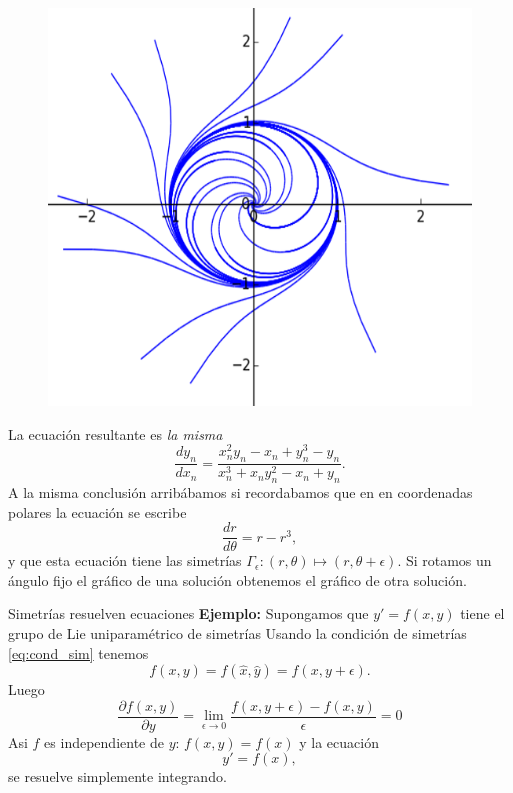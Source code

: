 \begin{figure}
 \includegraphics[scale=.4]{imagenes/sol_rotadas.png}
\end{figure}
La ecuación resultante es \emph{la misma}
\[\frac{dy_n}{dx_n}=\frac{x_{n}^{2} y_{n} - x_{n} + y_{n}^{3} - y_{n}}{x_{n}^{3} + x_{n} y_{n}^{2}
    - x_{n} + y_{n}}.\]
A la misma conclusión arribábamos si recordabamos que en en coordenadas polares la ecuación se escribe
\[\frac{dr}{d\theta}=r-r^3,\]
y que esta ecuación tiene las simetrías $\Gamma_{\epsilon}:(r,\theta)\mapsto (r,\theta+\epsilon)$. Si rotamos un ángulo fijo el gráfico de una solución obtenemos el gráfico de otra solución.










{Simetrías resuelven ecuaciones}\label{pag:sim_tras}
\textbf{Ejemplo:} Supongamos que $y'=f(x,y)$ tiene  el grupo de Lie uniparamétrico de simetrías
Usando la condición de simetrías \eqref{eq:cond_sim} tenemos
\[f(x,y)=f(\hat{x},\hat{y})=f(x,y+\epsilon).\]
Luego
\[\frac{\partial f(x,y)}{\partial y}=\lim_{\epsilon\to 0}\frac{f(x,y+\epsilon)-f(x,y)}{\epsilon}=0\]
Asi $f$ es independiente de $y$: $f(x,y)=f(x)$ y la ecuación
\[y'=f(x),\]
se resuelve simplemente integrando.



